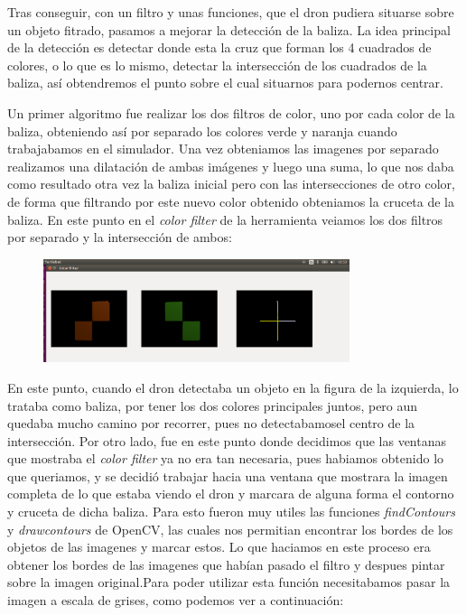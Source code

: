 \hspace{1cm} Tras conseguir, con un filtro y unas funciones, que el dron pudiera situarse sobre un objeto fitrado, pasamos a mejorar la detecci\'on de la baliza. La idea principal de la detecci\'on es detectar donde esta la cruz que forman los 4 cuadrados de colores, o lo que es lo mismo, detectar la intersecci\'on de los cuadrados de la baliza, as\'i obtendremos el punto sobre el cual situarnos para podernos centrar. 

\hspace{1cm} Un primer algoritmo fue realizar los dos filtros de color, uno por cada color de la baliza, obteniendo as\'i por separado los colores verde y naranja cuando trabajabamos en el simulador. Una vez obteniamos las imagenes por separado realizamos una dilataci\'on de ambas im\'agenes y luego una suma, lo que nos daba como resultado otra vez la baliza inicial pero con las intersecciones de otro color, de forma que filtrando por este nuevo color obtenido obteniamos la cruceta de la baliza. En este punto en el \textit{color filter} de la herramienta veiamos los dos filtros por separado y la intersecci\'on de ambos:

\begin{figure}[ht]
	\centering
		\includegraphics[width=0.8\textwidth]{imgs/E_Imagen_baliza.eps}
	\label{fig:E_Imagen_baliza}
\end{figure}

\hspace{1cm} En este punto, cuando el dron detectaba un objeto en la figura de la izquierda, lo trataba como baliza, por tener los dos colores principales juntos, pero aun quedaba mucho camino por recorrer, pues no detectabamosel centro de la intersecci\'on. Por otro lado, fue en este punto donde decidimos que las ventanas que mostraba el \textit{color filter} ya no era tan necesaria, pues habiamos obtenido lo que queriamos, y se decidi\'o trabajar hacia una ventana que mostrara la imagen completa de lo que estaba viendo el dron y marcara de alguna forma el contorno y cruceta de dicha baliza. Para esto fueron muy utiles las funciones \textit{findContours} y \textit{drawcontours} de OpenCV, las cuales nos permitian encontrar los bordes de los objetos de las imagenes y marcar estos. Lo que haciamos en este proceso era obtener los bordes de las imagenes que hab\'ian pasado el filtro y despues pintar sobre la imagen original.Para poder utilizar esta funci\'on necesitabamos pasar la imagen a escala de grises, como podemos ver a continuaci\'on:

